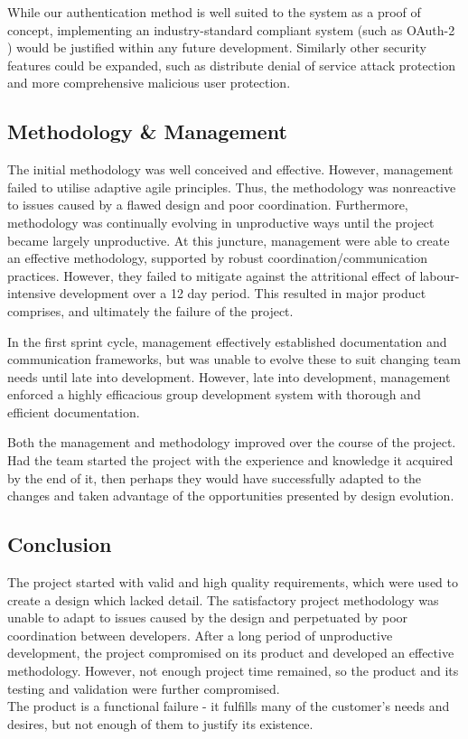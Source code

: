 \documentclass[9pt, titlepage]{extarticle}
\begin{document}
While our authentication method is well suited to the system as a proof of concept, implementing an industry-standard compliant system (such as OAuth-2 \cite{web:oauth}) would be justified within any future development. Similarly other security features could be expanded, such as distribute denial of service attack protection and more comprehensive malicious user protection.

\subsection{Methodology \& Management}

The initial methodology was well conceived and effective. However, management failed to utilise adaptive agile principles. Thus, the methodology was nonreactive to issues caused by a flawed design and poor coordination. Furthermore, methodology was continually evolving in unproductive ways until the project became largely unproductive. At this juncture, management were able to create an effective methodology, supported by robust coordination/communication practices. However, they failed to mitigate against the attritional effect of labour-intensive development over a 12 day period. This resulted in major product comprises, and ultimately the failure of the project.

In the first sprint cycle, management effectively established documentation and communication frameworks, but was unable to evolve these to suit changing team needs until late into development. However, late into development, management enforced a highly efficacious group development system with thorough and efficient documentation.

Both the management and methodology improved over the course of the project. Had the team started the project with the experience and knowledge it acquired by the end of it, then perhaps they would have successfully adapted to the changes and taken advantage of the opportunities presented by design evolution.

\subsection{Conclusion}

The project started with valid and high quality requirements, which were used to create a design which lacked detail. The satisfactory project methodology was unable to adapt to issues caused by the design and perpetuated by poor coordination between developers. After a long period of unproductive development, the project compromised on its product and developed an effective methodology. However, not enough project time remained, so the product and its testing and validation were further compromised.
\\The product is a functional failure - it fulfills many of the customer's needs and desires, but not enough of them to justify its existence.
\end{document}
